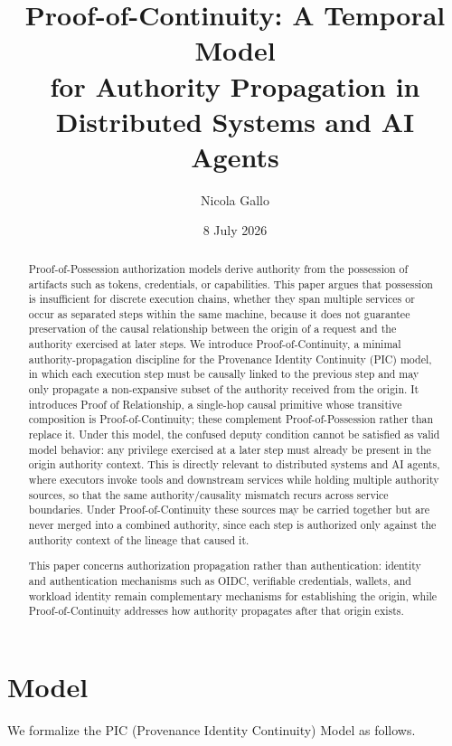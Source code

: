 \documentclass[11pt]{article}
\title{Proof-of-Continuity: A Temporal Model\\
for Authority Propagation in\\
Distributed Systems and AI Agents}
\author{Nicola Gallo}
\date{8 July 2026}
\begin{document}
\maketitle

\begin{abstract}
Proof-of-Possession authorization models derive authority from the possession
of artifacts such as tokens, credentials, or capabilities. This paper argues
that possession is insufficient for discrete execution chains, whether they
span multiple services or occur as separated steps within the same machine,
because it does not guarantee preservation of the causal relationship between the
origin of a request and the authority exercised at later steps. We introduce
Proof-of-Continuity, a minimal authority-propagation discipline for the
Provenance Identity Continuity (PIC) model, in which each execution step must be
causally linked to the previous step and may only propagate a non-expansive
subset of the authority received from the origin. It introduces Proof of
Relationship, a single-hop causal primitive whose transitive composition is
Proof-of-Continuity; these complement Proof-of-Possession rather than replace it.
Under this model, the confused deputy condition cannot be satisfied as valid
model behavior: any privilege exercised at a later step must already be present
in the origin authority context. This is directly relevant to distributed
systems and AI agents, where executors invoke tools and downstream services
while holding multiple authority sources, so that the same authority/causality
mismatch recurs across service boundaries. Under Proof-of-Continuity these
sources may be carried together but are never merged into a combined authority,
since each step is authorized only against the authority context of the lineage
that caused it.

This paper concerns authorization propagation rather than authentication:
identity and authentication mechanisms such as OIDC, verifiable credentials,
wallets, and workload identity remain complementary mechanisms for establishing
the origin, while
Proof-of-Continuity addresses how authority propagates after that origin exists.
\end{abstract}

\section{Model}

We formalize the PIC (Provenance Identity Continuity) Model as follows.
\end{document}
